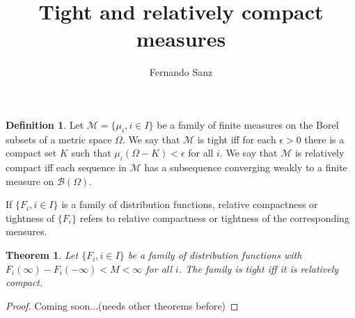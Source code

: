 \documentclass[12pt]{article}
\newtheorem*{thm}{Theorem}
\theoremstyle{definition}
\newtheorem{defn}{Definition}
\newcommand{\B}{\mathcal{B}}
\newcommand{\M}{\mathcal{M}}
\begin{document}
\title{Tight and relatively compact measures}%
\author{Fernando Sanz}%

\begin{defn}
Let $\M=\{\mu_i,i \in I \}$ be a family of finite measures on the
Borel subsets of a metric space $\Omega$. We say that $\M$ is tight
iff for each $\epsilon>0$ there is a compact set $K$ such that
$\mu_i(\Omega-K)<\epsilon$ for all $i$. We say that $\M$ is
relatively compact iff each sequence in $\M$ has a subsequence
converging weakly to a finite measure on $\B(\Omega)$.

If $\{F_i,i \in I \}$ is a family of distribution functions,
relative compactness or tightness of $\{F_i\}$ refers to relative
compactness or tightness of the corresponding measures.
\end{defn}

\medskip

\begin{thm}
Let $\{F_i,i \in I \}$ be a family of distribution functions with
$F_i(\infty)-F_i(-\infty)<M<\infty$ for all  $i$. The family is
tight iff it is relatively compact.
\end{thm}

\begin{proof}
Coming soon...(needs other theorems before)
\end{proof}
\end{document}
